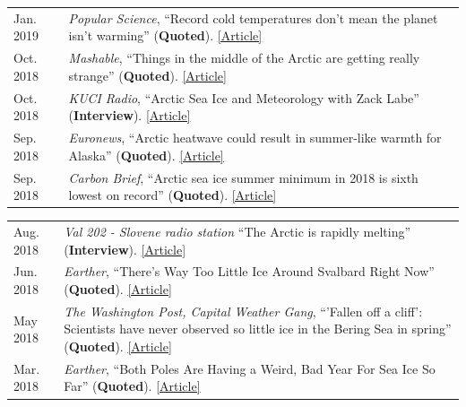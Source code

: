 \documentclass[margin,line,palatino,courier,10pt]{res}
\begin{document}
\begin{resume}
\begin{tabular}{@{}p{0.9in}p{4in}}
Jan. 2019 & \textit{Popular Science}, ``Record cold temperatures don't mean the planet isn't warming'' (\textbf{Quoted}). \href{https://www.popsci.com/cold-weather-climate-change}{[Article]}\\
Oct. 2018 & \textit{Mashable}, ``Things in the middle of the Arctic are getting really strange'' (\textbf{Quoted}). \href{https://mashable.com/article/low-arctic-ice-central-basin/#xQmvXhcFJPqH}{[Article]}\\
Oct. 2018 & \textit{KUCI Radio}, ``Arctic Sea Ice and Meteorology with Zack Labe'' (\textbf{Interview}). \href{https://thesciencespiel.org/2018/10/08/october-8-2018-arctic-sea-ice-and-meteorology-with-zack-labe/}{[Article]}\\
Sep. 2018 & \textit{Euronews}, ``Arctic heatwave could result in summer-like warmth for Alaska'' (\textbf{Quoted}). \href{https://www.euronews.com/2018/09/29/arctic-heatwave-could-result-in-summer-like-warmth-in-alaska}{[Article]}\\
Sep. 2018 & \textit{Carbon Brief}, ``Arctic sea ice summer minimum in 2018 is sixth lowest on record'' (\textbf{Quoted}). \href{https://www.carbonbrief.org/arctic-sea-ice-summer-minimum-in-2018-is-sixth-lowest-on-record}{[Article]}\\
\end{tabular}
\begin{tabular}{@{}p{0.9in}p{4in}}
Aug. 2018 & \textit{Val 202 - Slovene radio station} ``The Arctic is rapidly melting'' (\textbf{Interview}). \href{https://val202.rtvslo.si/2018/08/sonce-je-odprlo-zemljin-hladilnik/}{[Article]}\\
Jun. 2018 & \textit{Earther}, ``There's Way Too Little Ice Around Svalbard Right Now'' (\textbf{Quoted}). \href{https://earther.com/theres-way-too-little-ice-around-svalbard-right-now-1826567780}{[Article]}\\
May 2018 & \textit{The Washington Post, Capital Weather Gang}, ``'Fallen off a cliff': Scientists have never observed so little ice in the Bering Sea in spring'' (\textbf{Quoted}). \href{https://www.washingtonpost.com/news/capital-weather-gang/wp/2018/05/03/fallen-off-a-cliff-scientists-have-never-observed-so-little-ice-in-the-bering-sea-in-spring/?noredirect=on&utm_term=.cbcf2781b5e4}{[Article]}\\
Mar. 2018 & \textit{Earther}, ``Both Poles Are Having a Weird, Bad Year For Sea Ice So Far'' (\textbf{Quoted}). \href{https://earther.com/both-poles-are-having-a-weird-bad-year-for-sea-ice-so-1824074352}{[Article]}\\

\end{tabular}
\end{resume}
\end{document}
